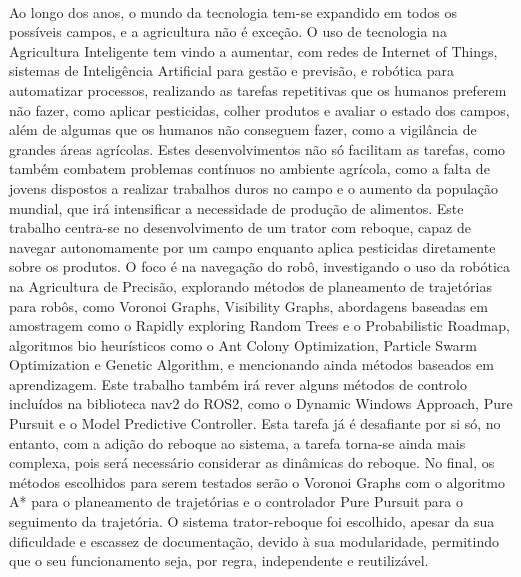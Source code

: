 
%

\paragraph{}Ao longo dos anos, o mundo da tecnologia tem-se expandido em todos os possíveis campos, 
e a agricultura não é exceção. O uso de tecnologia na Agricultura Inteligente tem vindo a aumentar, 
com redes de Internet of Things, sistemas de Inteligência Artificial para gestão e previsão, e robótica para 
automatizar processos, realizando as tarefas repetitivas que os humanos preferem não fazer, como 
aplicar pesticidas, colher produtos e avaliar o estado dos campos, além de algumas que os humanos 
não conseguem fazer, como a vigilância de grandes áreas agrícolas. Estes desenvolvimentos não só 
facilitam as tarefas, como também combatem problemas contínuos no ambiente agrícola, como a falta de 
jovens dispostos a realizar trabalhos duros no campo e o aumento da população mundial, que irá 
intensificar a necessidade de produção de alimentos.
Este trabalho centra-se no desenvolvimento de um trator com reboque, capaz de navegar 
autonomamente por um campo enquanto aplica pesticidas diretamente sobre os produtos. 
O foco é na navegação do robô, investigando o uso da robótica na Agricultura de Precisão, 
explorando métodos de planeamento de trajetórias para robôs, como Voronoi Graphs, Visibility Graphs, 
abordagens baseadas em amostragem como o Rapidly exploring Random Trees e o Probabilistic Roadmap, algoritmos bio heurísticos como o Ant Colony Optimization, 
Particle Swarm Optimization e Genetic Algorithm, e mencionando ainda métodos baseados em aprendizagem. Este trabalho também irá rever alguns 
métodos de controlo incluídos na biblioteca nav2 do ROS2, como o Dynamic Windows Approach, Pure Pursuit e o Model Predictive Controller. Esta 
tarefa já é desafiante por si só, no entanto, com a adição do reboque ao sistema, a tarefa torna-se 
ainda mais complexa, pois será necessário considerar as dinâmicas do reboque. No final, os métodos 
escolhidos para serem testados serão o Voronoi Graphs com o algoritmo A* para o planeamento de 
trajetórias e o controlador Pure Pursuit para o seguimento da trajetória.
O sistema trator-reboque foi escolhido, apesar da sua dificuldade e escassez de documentação, 
devido à sua modularidade, permitindo que o seu funcionamento seja, por regra, independente e reutilizável.


